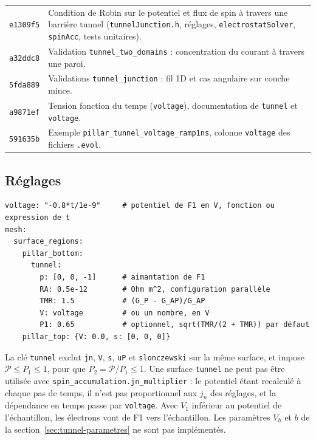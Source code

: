 \documentclass[11pt,a4paper]{article}
\begin{document}
\begin{center}
\renewcommand{\arraystretch}{1.2}
\begin{tabular}{l>{\raggedright\arraybackslash}p{12cm}}
  \toprule
  \texttt{e1309f5} & Condition de Robin sur le potentiel et flux de spin à
    travers une barrière tunnel (\texttt{tunnelJunction.h}, réglages,
    \texttt{electrostatSolver}, \texttt{spinAcc}, tests unitaires). \\
  \texttt{a32ddc8} & Validation \texttt{tunnel\_two\_domains} :
    concentration du courant à travers une paroi. \\
  \texttt{5fda889} & Validations \texttt{tunnel\_junction} : fil 1D et cas
    angulaire sur couche mince. \\
  \texttt{a9871ef} & Tension fonction du temps (\texttt{voltage}),
    documentation de \texttt{tunnel} et \texttt{voltage}. \\
  \texttt{591635b} & Exemple \texttt{pillar\_tunnel\_voltage\_ramp1ns},
    colonne \texttt{voltage} des fichiers \texttt{.evol}. \\
  \bottomrule
\end{tabular}
\end{center}

\subsection{Réglages}

\begin{verbatim}
voltage: "-0.8*t/1e-9"     # potentiel de F1 en V, fonction ou expression de t
mesh:
  surface_regions:
    pillar_bottom:
      tunnel:
        p: [0, 0, -1]      # aimantation de F1
        RA: 0.5e-12        # Ohm m^2, configuration parallèle
        TMR: 1.5           # (G_P - G_AP)/G_AP
        V: voltage         # ou un nombre, en V
        P1: 0.65           # optionnel, sqrt(TMR/(2 + TMR)) par défaut
    pillar_top: {V: 0.0, s: [0, 0, 0]}
\end{verbatim}
La clé \texttt{tunnel} exclut \texttt{jn}, \texttt{V}, \texttt{s},
\texttt{uP} et \texttt{slonczewski} sur la même surface, et impose
$\mathcal{P}\le P_1\le1$, pour que $P_2 = \mathcal{P}/P_1\le1$. Une surface
\texttt{tunnel} ne peut pas être utilisée avec
\texttt{spin\_accumulation.jn\_multiplier} : le potentiel étant recalculé à
chaque pas de temps, il n'est pas proportionnel aux $j_n$ des réglages, et la
dépendance en temps passe par \texttt{voltage}.
Avec $V_1$ inférieur au potentiel de l'échantillon, les électrons vont de F1
vers l'échantillon. Les paramètres $V_h$ et $b$ de la
section~\ref{sec:tunnel-parametres} ne sont pas implémentés.
\end{document}
